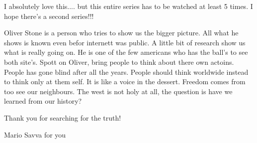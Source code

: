 \begin{itemize}

I absolutely love this.... but this entire series has to be watched at least 5
times. I hope there's a second series!!!


Oliver Stone is a person who tries to show us the bigger picture. All what he
shows is known even befor internett was public. A little bit of research show
us what is really going on. He is one of the few americans who has the ball's
to see both site's. Spott on Oliver, bring people to think about there own
actoins. People has gone blind after all the years. People should think
worldwide instead to think only at them self. It is like a voice in the
dessert. Freedom comes from too see our neighbours. The west is not holy at
all, the question is have we learned from our history?


Thank you for searching for the truth!


Mario Savva for you


\end{itemize} %



